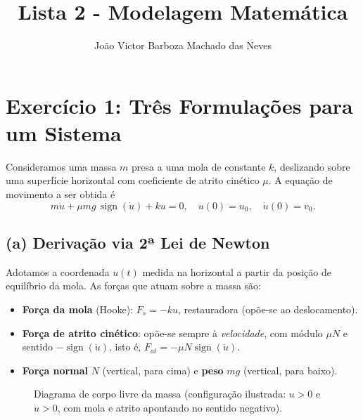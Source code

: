 \documentclass{article}
\title{Lista 2 - Modelagem Matemática}
\author{João Victor Barboza Machado das Neves}
\date{} %
\begin{document}
\maketitle

\section*{Exercício 1: Três Formulações para um Sistema}

Consideramos uma massa $m$ presa a uma mola de constante $k$, deslizando sobre uma superfície horizontal com coeficiente de atrito cinético $\mu$. A equação de movimento a ser obtida é
\[ m\ddot{u} + \mu m g\, \operatorname{sign}(\dot{u}) + k u = 0, \quad u(0) = u_0, \quad \dot{u}(0) = v_0. \]

\subsection*{(a) Derivação via 2ª Lei de Newton}

Adotamos a coordenada $u(t)$ medida na horizontal a partir da posição de equilíbrio da mola. As forças que atuam sobre a massa são:
\begin{itemize}
    \item \textbf{Força da mola} (Hooke): $F_s = -ku$, restauradora (opõe-se ao deslocamento).
    \item \textbf{Força de atrito cinético}: opõe-se sempre à \textit{velocidade}, com módulo $\mu N$ e sentido $-\operatorname{sign}(\dot{u})$, isto é, $F_{at} = -\mu N \operatorname{sign}(\dot{u})$.
    \item \textbf{Força normal} $N$ (vertical, para cima) e \textbf{peso} $mg$ (vertical, para baixo).
\end{itemize}

\begin{figure}[H]
    \centering
    \caption{Diagrama de corpo livre da massa (configuração ilustrada: $u>0$ e $\dot{u}>0$, com mola e atrito apontando no sentido negativo).}
\end{figure}
\end{document}
